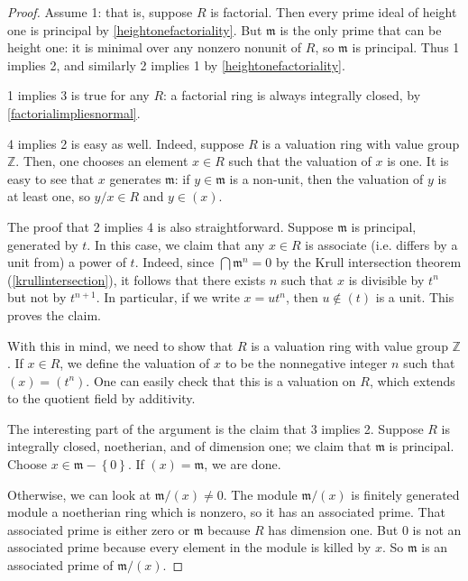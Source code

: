 \begin{proof}
Assume 1: that is, suppose $R$ is factorial. Then every prime ideal of height one is principal
by \cref{heightonefactoriality}.
But $\mathfrak{m}$ is the only prime that can be height one: it is minimal over
any nonzero nonunit of $R$, so $\mathfrak{m}$ is principal. Thus 1 implies 2, and similarly 2 implies 1 by
\cref{heightonefactoriality}.

1 implies 3 is true for any $R$: a factorial ring is always integrally
closed, by \cref{factorialimpliesnormal}.

4 implies 2 is easy as well. Indeed, suppose $R$ is a valuation ring with
value group $\mathbb{Z}$. Then, one chooses an element $x \in R$ such that the valuation of
$x$ is one. It is easy to see that  $x$ generates $\mathfrak{m}$: if $y
\in \mathfrak{m}$ is a non-unit, then the valuation of $y$ is at least one,
so $y/x \in R$ and $y \in (x)$. 

The proof that 2 implies 4 is also straightforward. Suppose
$\mathfrak{m}$ is principal, generated by $t$. 
In this case, we claim that any $x \in R$ is associate (i.e. differs by a
unit from) a power of $t$.
Indeed, since $\bigcap \mathfrak{m}^n = 0$ by the Krull intersection theorem
(\cref{krullintersection}), it follows that there exists $n$ such that $x$ is
divisible by $t^n$ but not by $t^{n+1}$. 
In particular, if we write $x = u t^n$, then $u \notin (t)$ is a unit. This
proves the claim.

With this in mind, we need to show that $R$ is a valuation ring with value
group $\mathbb{Z}$.
If $x
\in R$, we define the valuation of $x$ to be the nonnegative integer $n$ such
that  $(x) = (t^n)$. One can
easily check that this is a valuation on $R$, which extends to the quotient
field by additivity.

The interesting part of the argument is the claim that 3
implies 2. Suppose $R$ is integrally closed, noetherian, and of dimension one; we claim that $\mathfrak{m}$ is
principal. Choose $x \in \mathfrak{m} - \left\{0\right\}$. If $(x) =
\mathfrak{m}$, we are done. 

Otherwise, we can look at $\mathfrak{m}/(x) \neq
0$.  The module $\mathfrak{m}/(x)$ is finitely generated module a noetherian ring which is
nonzero, so it has an associated prime. That associated prime is either zero or
$\mathfrak{m}$ because $R$ has dimension one. But $0$ is not an associated prime because every element in the
module is killed by $x$. So $\mathfrak{m}$ is an associated prime of
$\mathfrak{m}/(x)$.


\end{proof}
